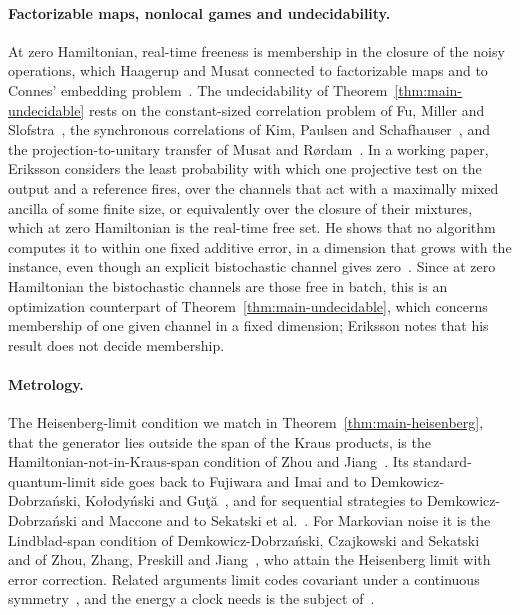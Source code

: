 \paragraph{Factorizable maps, nonlocal games and undecidability.} At zero Hamiltonian, real-time freeness is membership in the closure of the noisy operations, which Haagerup and Musat connected to factorizable maps and to Connes' embedding problem~\cite{HaagerupMusat11,MusatRordam,Musat25}. The undecidability of Theorem~\ref{thm:main-undecidable} rests on the constant-sized correlation problem of Fu, Miller and Slofstra~\cite{FMS}, the synchronous correlations of Kim, Paulsen and Schafhauser~\cite{KPS18}, and the projection-to-unitary transfer of Musat and R\o rdam~\cite{MusatRordam}. In a working paper, Eriksson considers the least probability with which one projective test on the output and a reference fires, over the channels that act with a maximally mixed ancilla of some finite size, or equivalently over the closure of their mixtures, which at zero Hamiltonian is the real-time free set. He shows that no algorithm computes it to within one fixed additive error, in a dimension that grows with the instance, even though an explicit bistochastic channel gives zero~\cite{Eriksson26}. Since at zero Hamiltonian the bistochastic channels are those free in batch, this is an optimization counterpart of Theorem~\ref{thm:main-undecidable}, which concerns membership of one given channel in a fixed dimension; Eriksson notes that his result does not decide membership.

\paragraph{Metrology.} The Heisenberg-limit condition we match in Theorem~\ref{thm:main-heisenberg}, that the generator lies outside the span of the Kraus products, is the Hamiltonian-not-in-Kraus-span condition of Zhou and Jiang~\cite{ZhouJiang21}. Its standard-quantum-limit side goes back to Fujiwara and Imai and to Demkowicz-Dobrza\'nski, Ko\l{}ody\'nski and Gu\c{t}\u{a}~\cite{FujiwaraImai08,DKG12,KD13}, and for sequential strategies to Demkowicz-Dobrza\'nski and Maccone and to Sekatski et al.~\cite{DemkowiczMaccone14,SSKD17}. For Markovian noise it is the Lindblad-span condition of Demkowicz-Dobrza\'nski, Czajkowski and Sekatski~\cite{DemkowiczCzajkowskiSekatski17} and of Zhou, Zhang, Preskill and Jiang~\cite{ZhouZhangPreskillJiang18}, who attain the Heisenberg limit with error correction. Related arguments limit codes covariant under a continuous symmetry~\cite{KubicaDemkowicz21,ZhouLiuJiang21}, and the energy a clock needs is the subject of~\cite{ChiribellaYangRenner21,Erker17}.

